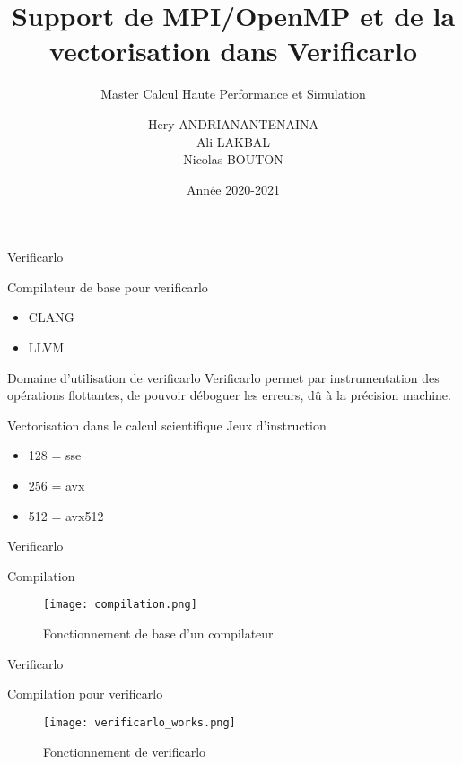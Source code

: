\documentclass{beamer}
\title[Support pour Verificarlo]{Support de MPI/OpenMP et de la vectorisation dans Verificarlo}
\subtitle{Master Calcul Haute Performance et Simulation}
\author[Hery, Ali, Nicolas]{Hery ANDRIANANTENAINA \\ Ali LAKBAL \\ Nicolas BOUTON}
\institute{\textbf{Encadrant:} Eric PETIT}
\date{Année 2020-2021}
\begin{document}
\maketitle

\begin{frame}{Verificarlo}
    \begin{block}{Compilateur de base pour verificarlo}
      \begin{itemize}
          \item CLANG
          \item LLVM
      \end{itemize}
    \end{block}
  \begin{block}{Domaine d'utilisation de verificarlo}
    Verificarlo permet par instrumentation des opérations flottantes, de pouvoir déboguer les erreurs, dû à la précision machine.
  \end{block}
  \begin{block}{Vectorisation dans le calcul scientifique}
    Jeux d'instruction 
        \begin{itemize}
            \item 128 = sse
            \item 256 = avx
            \item 512 = avx512
        \end{itemize}
  \end{block}
\end{frame}

\begin{frame}{Verificarlo}
    \begin{block}{Compilation}
      \begin{figure}
          \centering
          \texttt{[image: compilation.png]}
          \caption{Fonctionnement de base d'un compilateur}
          \label{fig:my_label}
      \end{figure}
    \end{block}
\end{frame}

\begin{frame}{Verificarlo}
    \begin{block}{Compilation pour verificarlo}
      \begin{figure}
          \centering
          \texttt{[image: verificarlo\_works.png]}
          \caption{Fonctionnement de verificarlo}
          \label{fig:my_label}
      \end{figure}
    \end{block}
\end{frame}
\end{document}

